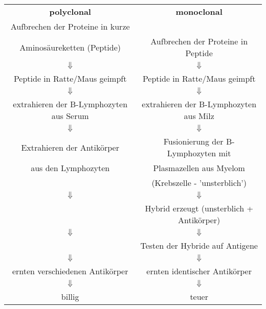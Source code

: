 \begin{tabular}{cc}
  \textbf{polyclonal} & \textbf{monoclonal}\\
  Aufbrechen der Proteine in kurze\\ 
  Aminosäureketten (Peptide) & Aufbrechen der Proteine in Peptide\\
  $\Downarrow$ & $\Downarrow$\\
  Peptide in Ratte/Maus geimpft & Peptide in Ratte/Maus geimpft\\
  $\Downarrow$ & $\Downarrow$\\
  extrahieren der B-Lymphozyten aus Serum & extrahieren der B-Lymphozyten aus Milz\\
  $\Downarrow$ & $\Downarrow$\\
  Extrahieren der Antikörper & Fusionierung der B-Lymphozyten mit\\ 
   aus den Lymphozyten & Plasmazellen aus Myelom\\
   & (Krebszelle - 'unsterblich')\\
  $\Downarrow$ & $\Downarrow$\\
  & Hybrid erzeugt (unsterblich + Antikörper)\\
  $\Downarrow$ & $\Downarrow$\\
  & Testen der Hybride auf Antigene\\
  $\Downarrow$ & $\Downarrow$\\
  ernten verschiedenen Antikörper & ernten identischer Antikörper\\
  $\Downarrow$ & $\Downarrow$\\
  billig & teuer
\end{tabular}